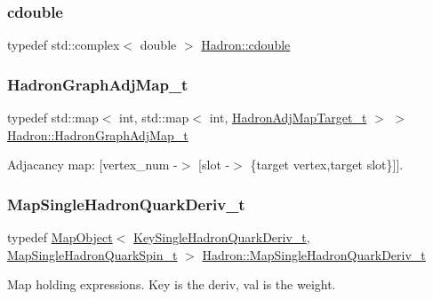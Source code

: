 \subsubsection{\texorpdfstring{cdouble}{cdouble}}
{\footnotesize\ttfamily typedef std\+::complex$<$ double $>$ \mbox{\hyperlink{namespaceHadron_abaab2f90393b8dd8d93060e6ce6568e7}{Hadron\+::cdouble}}}

\mbox{\label{namespaceHadron_ad6387ffed6a1bf53021dce29b71d3a04}} 
\subsubsection{\texorpdfstring{HadronGraphAdjMap\_t}{HadronGraphAdjMap\_t}}
{\footnotesize\ttfamily typedef std\+::map$<$ int, std\+::map$<$ int, \mbox{\hyperlink{structHadron_1_1HadronAdjMapTarget__t}{Hadron\+Adj\+Map\+Target\+\_\+t}} $>$ $>$ \mbox{\hyperlink{namespaceHadron_ad6387ffed6a1bf53021dce29b71d3a04}{Hadron\+::\+Hadron\+Graph\+Adj\+Map\+\_\+t}}}



Adjacancy map\+: \mbox{[}vertex\+\_\+num -\/$>$ \mbox{[}slot -\/$>$ \{target vertex,target slot\}\mbox{]}\mbox{]}. 

\mbox{\label{namespaceHadron_aa588220689caea8a6aad4d0296526e6b}} 
\subsubsection{\texorpdfstring{MapSingleHadronQuarkDeriv\_t}{MapSingleHadronQuarkDeriv\_t}}
{\footnotesize\ttfamily typedef \mbox{\hyperlink{classADAT_1_1MapObject}{Map\+Object}}$<$ \mbox{\hyperlink{structHadron_1_1KeySingleHadronQuarkDeriv__t}{Key\+Single\+Hadron\+Quark\+Deriv\+\_\+t}}, \mbox{\hyperlink{namespaceHadron_a22279e56b59508dc8dd2c8991dc911fd}{Map\+Single\+Hadron\+Quark\+Spin\+\_\+t}} $>$ \mbox{\hyperlink{namespaceHadron_aa588220689caea8a6aad4d0296526e6b}{Hadron\+::\+Map\+Single\+Hadron\+Quark\+Deriv\+\_\+t}}}



Map holding expressions. Key is the deriv, val is the weight. 

\mbox{\label{namespaceHadron_a03b319764f85c20434f20a269ce5f388}} 

